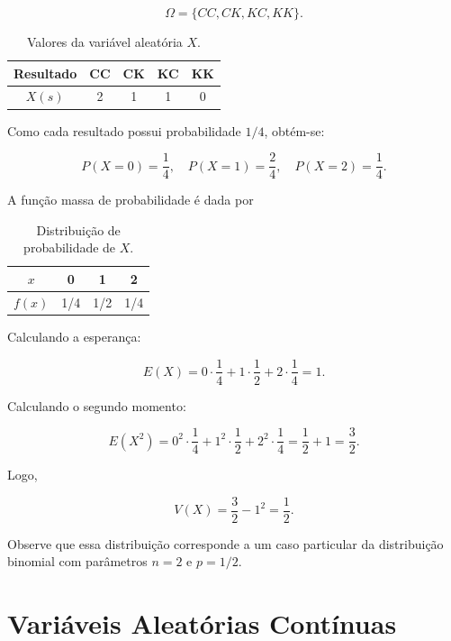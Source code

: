 \[
\Omega=\{CC,CK,KC,KK\}.
\]

\begin{table}[H]
\centering
\caption{Valores da variável aleatória $X$.}
\begin{tabular}{c|cccc}
\hline\hline
Resultado & CC & CK & KC & KK\\
\hline
$X(s)$    & 2  & 1  & 1  & 0\\
\hline\hline
\end{tabular}
\end{table}

Como cada resultado possui probabilidade $1/4$, obtém-se:

\[
P(X=0)=\frac{1}{4}, \quad
P(X=1)=\frac{2}{4}, \quad
P(X=2)=\frac{1}{4}.
\]

A função massa de probabilidade é dada por

\begin{table}[H]
\centering
\caption{Distribuição de probabilidade de $X$.}
\begin{tabular}{c|ccc}
\hline\hline
$x$    & 0 & 1 & 2\\
\hline
$f(x)$ & 1/4 & 1/2 & 1/4\\
\hline\hline
\end{tabular}
\end{table}

Calculando a esperança:

\[
E(X)=0\cdot\frac14 + 1\cdot\frac12 + 2\cdot\frac14 = 1.
\]

Calculando o segundo momento:

\[
E(X^2)=0^2\cdot\frac14 + 1^2\cdot\frac12 + 2^2\cdot\frac14
= \frac12 + 1 = \frac32.
\]

Logo,

\[
V(X)=\frac32 - 1^2 = \frac12.
\]

Observe que essa distribuição corresponde a um caso particular da
distribuição binomial com parâmetros $n=2$ e $p=1/2$.

\newpage
\section{Variáveis Aleatórias Contínuas}

